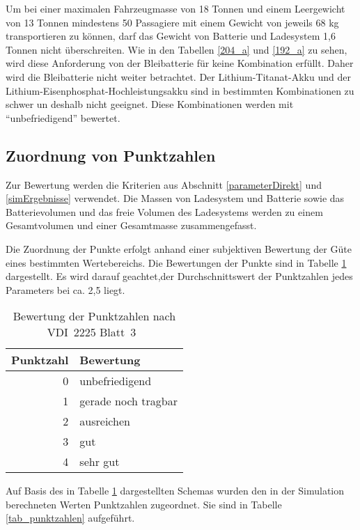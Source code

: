 Um bei einer maximalen Fahrzeugmasse von 18 Tonnen und einem Leergewicht von 13 Tonnen mindestens 50 Passagiere mit einem Gewicht von jeweils 68 kg transportieren zu können, darf das Gewicht von Batterie und Ladesystem 1,6 Tonnen nicht überschreiten. Wie in den Tabellen \ref{204_a} und \ref{192_a} zu sehen, wird diese Anforderung von der Bleibatterie für keine Kombination erfüllt. Daher wird die Bleibatterie nicht weiter betrachtet. Der Lithium-Titanat-Akku und der Lithium-Eisenphosphat-Hochleistungsakku sind in bestimmten Kombinationen zu schwer un deshalb nicht geeignet. Diese Kombinationen werden mit "`unbefriedigend"' bewertet.

\subsection{Zuordnung von Punktzahlen}
Zur Bewertung werden die Kriterien aus Abschnitt \ref{parameterDirekt} und \ref{simErgebnisse} verwendet. Die Massen von Ladesystem und Batterie sowie das Batterievolumen und das freie Volumen des Ladesystems werden zu einem Gesamtvolumen und einer Gesamtmasse zusammengefasst.

Die Zuordnung der Punkte erfolgt anhand einer subjektiven Bewertung der Güte eines bestimmten Wertebereichs. Die Bewertungen der Punkte sind in Tabelle \ref{tabPunkte} dargestellt. Es wird darauf geachtet,der Durchschnittswert der Punktzahlen jedes Parameters bei ca. 2,5 liegt.

\begin{table} \centering
	\begin{tabular}{rl}
		\toprule
		Punktzahl & Bewertung           \\ \midrule
		        0 & unbefriedigend      \\
		        1 & gerade noch tragbar \\
		        2 & ausreichen          \\
		        3 & gut                 \\
		        4 & sehr gut            \\ \bottomrule
	\end{tabular}
	\caption[Bewertung der Punktzahlen]{Bewertung der Punktzahlen nach VDI~2225 Blatt~3~\cite[S. 5]{vdi:2225}}
	\label{tabPunkte}
\end{table}

Auf Basis des in Tabelle \ref{tabPunkte} dargestellten Schemas wurden den in der Simulation berechneten Werten Punktzahlen zugeordnet. Sie sind in Tabelle \ref{tab_punktzahlen} aufgeführt.

